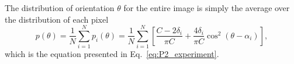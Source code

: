\documentclass[]{interact}
\begin{document}
The distribution of orientation $\theta$ for the entire image is simply the average over the distribution of each pixel
%
\begin{equation}
p(\theta) = \frac{1}{N} \sum_{i=1}^N p_i(\theta) = \frac{1}{N} \sum_{i=1}^N \left[ \frac{C-2\delta_i}{\pi C} + \frac{4 \delta_i}{\pi C}\cos^2(\theta-\alpha_i) \right],
\end{equation}
%
which is the equation presented in Eq.\ \eqref{eq:P2_experiment}.
\end{document}

